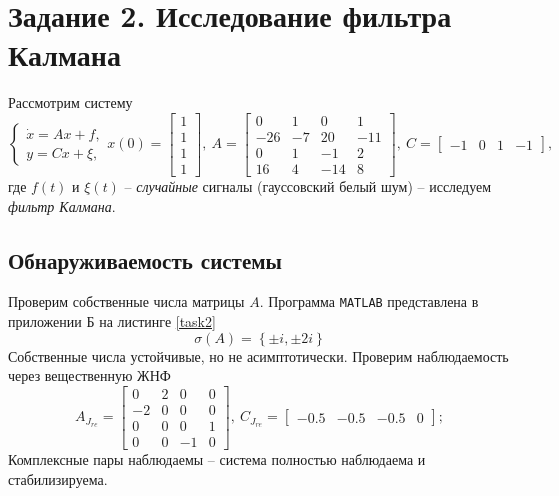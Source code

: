 \documentclass[a4paper, 12pt]{article}
\begin{document}
    \section{Задание 2. Исследование фильтра Калмана}
    Рассмотрим систему
    $$
    \begin{cases}
        \dot{x}=Ax+f,\\
        y=Cx+\xi,
    \end{cases} x(0)=\begin{bmatrix}
        1\\1\\1\\1
    \end{bmatrix},\ A=\begin{bmatrix}
        0 &1 &0 &1\\
        -26 &-7 &20 &-11\\
        0 &1 &-1 &2\\
        16 &4 &-14 &8
    \end{bmatrix},\ C=\begin{bmatrix}
        -1 &0 &1 &-1
    \end{bmatrix},
    $$
    где $f(t)$ и $\xi(t)$ -- \textit{случайные} сигналы (гауссовский белый шум) -- исследуем \textit{фильтр Калмана}.


    \subsection{Обнаруживаемость системы}
    Проверим собственные числа матрицы $A$. Программа \texttt{MATLAB} представлена
    в приложении Б на листинге \ref{task2}
    $$
    \sigma\left( A \right)=\left\{ \pm i,\pm2i \right\}
    $$
    Собственные числа устойчивые, но не асимптотически. Проверим наблюдаемость через
    вещественную ЖНФ
    $$
    A_{J_{re}}=\begin{bmatrix}
        0    &2   &0    &0\\
   -2   &0    &0   &0\\
    0   &0    &0    &1\\
   0   &0   &-1   &0
    \end{bmatrix},\ C_{J_{re}}=\begin{bmatrix}
        -0.5   &-0.5   &-0.5  &0
    \end{bmatrix};
    $$
    Комплексные пары наблюдаемы -- система полностью наблюдаема и стабилизируема.
\end{document}
